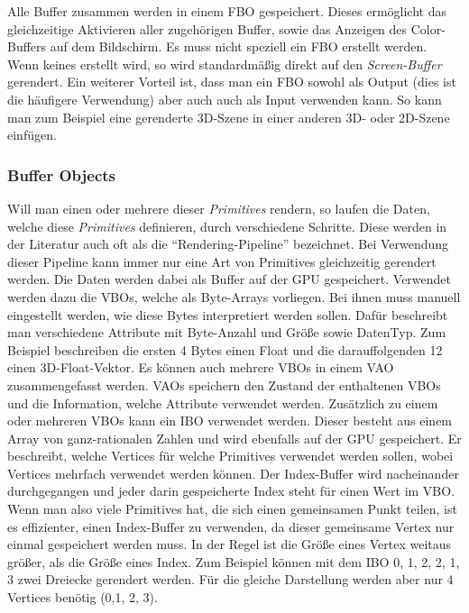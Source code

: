 Alle Buffer zusammen werden in einem \ac{FBO} gespeichert. Dieses ermöglicht das gleichzeitige Aktivieren aller zugehörigen Buffer, sowie das Anzeigen des Color-Buffers auf dem Bildschirm. Es muss nicht speziell ein \ac{FBO} erstellt werden. Wenn keines erstellt wird, so wird standardmäßig direkt auf den \textit{Screen-Buffer} gerendert. Ein weiterer Vorteil ist, dass man ein \ac{FBO} sowohl als Output (dies ist die häufigere Verwendung) aber auch auch als Input verwenden kann. So kann man zum Beispiel eine gerenderte 3D-Szene in einer anderen 3D- oder 2D-Szene einfügen.  

\subsubsection{Buffer Objects}
Will man einen oder mehrere dieser \textit{Primitives} rendern, so laufen die Daten, welche diese \textit{Primitives} definieren, durch verschiedene Schritte. Diese werden in der Literatur auch oft als die "`Rendering-Pipeline"' bezeichnet. Bei Verwendung dieser Pipeline kann immer nur eine Art von Primitives gleichzeitig gerendert werden.
Die Daten werden dabei als Buffer auf der \ac{GPU} gespeichert. Verwendet werden dazu die \acp{VBO}, welche als Byte-Arrays vorliegen. Bei ihnen muss manuell eingestellt werden, wie diese Bytes interpretiert werden sollen. Dafür beschreibt man verschiedene Attribute mit Byte-Anzahl und Größe sowie DatenTyp. Zum Beispiel beschreiben die ersten 4 Bytes einen Float und die darauffolgenden 12 einen 3D-Float-Vektor. Es können auch mehrere \ac{VBO}s in einem \ac{VAO} zusammengefasst werden. \acp{VAO} speichern den Zustand der enthaltenen \acp{VBO} und die Information, welche Attribute verwendet werden. Zusätzlich zu einem oder mehreren \acp{VBO} kann ein \ac{IBO} verwendet werden. Dieser besteht aus einem Array von ganz-rationalen Zahlen und wird ebenfalls auf der \ac{GPU} gespeichert. 
Er beschreibt, welche Vertices für welche Primitives verwendet werden sollen, wobei Vertices mehrfach verwendet werden können. 
Der Index-Buffer wird nacheinander durchgegangen und jeder darin gespeicherte Index steht für einen Wert im \ac{VBO}. Wenn man also viele Primitives hat, die sich einen gemeinsamen Punkt teilen, ist es effizienter, einen Index-Buffer zu verwenden, da dieser gemeinsame Vertex nur einmal gespeichert werden muss. In der Regel ist die Größe eines Vertex weitaus größer, als die Größe eines Index. Zum Beispiel können mit dem \ac{IBO} { 0, 1, 2, 2, 1, 3} zwei Dreiecke gerendert werden. Für die gleiche Darstellung werden aber nur 4 Vertices benötig (0,1, 2, 3)\cite{ThinMatrix}.

